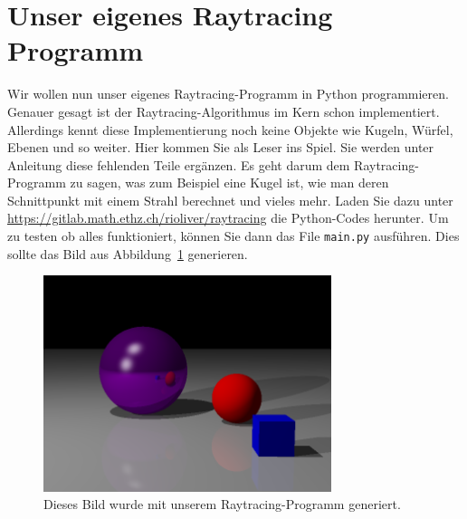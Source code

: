 \section{Unser eigenes Raytracing Programm}
Wir wollen nun unser eigenes Raytracing-Programm in Python programmieren.
Genauer gesagt ist der Raytracing-Algorithmus im Kern schon implementiert.
Allerdings kennt diese Implementierung noch keine Objekte wie Kugeln, Würfel, Ebenen und so weiter.
Hier kommen Sie als Leser ins Spiel.
Sie werden unter Anleitung diese fehlenden Teile ergänzen.
Es geht darum dem Raytracing-Programm zu sagen, was zum Beispiel eine Kugel ist, wie man deren Schnittpunkt mit einem Strahl berechnet und vieles mehr.
Laden Sie dazu unter \url{https://gitlab.math.ethz.ch/rioliver/raytracing} die Python-Codes herunter.
Um zu testen ob alles funktioniert, können Sie dann das File \texttt{main.py} ausführen. Dies sollte das Bild aus Abbildung~\ref{fig:goal} generieren.
\begin{figure}[h!]
	\centering
	\includegraphics[width=0.75\textwidth]{images/outlook.png}
	\caption{Dieses Bild wurde mit unserem Raytracing-Programm generiert.}
	\label{fig:goal}
\end{figure}


